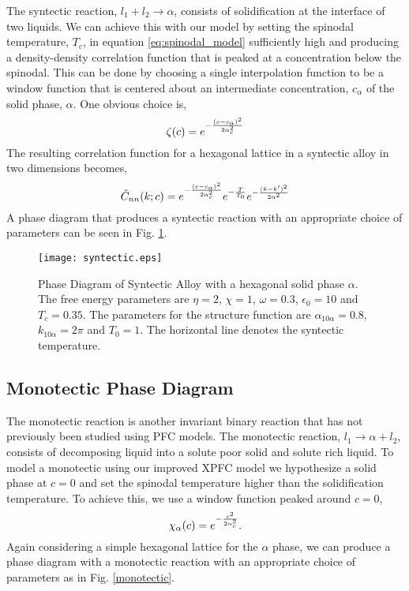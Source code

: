 The syntectic reaction, $l_1 + l_2 \rightarrow \alpha $, consists of
solidification at the interface of two liquids. We can achieve this with our
model by setting the spinodal temperature, $T_c$, in equation
\ref{eq:spinodal_model} sufficiently high and producing a density-density
correlation function that is peaked at a concentration below the spinodal. This
can be done by choosing a single interpolation function to be a window 
function that is centered about an intermediate concentration, $c_\alpha$ of 
the solid phase, $\alpha$. One obvious choice is, 
%
\begin{equation}
  \zeta(c) = e^{- \frac{(c - c_\alpha)^2}{2 \alpha_c^2}}
\end{equation}
%
The resulting correlation function for a hexagonal lattice in a syntectic alloy
in two dimensions becomes, 
%
\begin{equation}
  \tilde{C}_{nn}(k; c) = 
    e^{-\frac{(c - c_\alpha)^2}{2 \alpha_c^2}}
    e^{-\frac{T}{T_0}} 
    e^{-\frac{(k - k^\prime)^2}{2\alpha^2}}
\end{equation}
%
A phase diagram that produces a syntectic reaction with an appropriate choice
of parameters can be seen in Fig. \ref{syntectic}.

\begin{figure}
    \centering
	\texttt{[image: syntectic.eps]}
    \caption[Syntectic Phase Diagram]{
        \label{syntectic} Phase Diagram of Syntectic Alloy with a hexagonal
        solid phase $\alpha$. The free energy parameters are $\eta=2$,
        $\chi=1$, $\omega=0.3$, $\epsilon_0 = 10$ and $T_c=0.35$. The
        parameters for the structure function are $\alpha_{10\alpha} = 0.8$,
        $k_{10\alpha} = 2\pi$ and $T_0 = 1$. The horizontal line denotes the
        syntectic temperature.
    }
\end{figure}

\subsection{Monotectic Phase Diagram} %

The monotectic reaction is another invariant binary reaction that has not
previously been studied using PFC models. The monotectic reaction, $l_1
\rightarrow \alpha + l_2$, consists of decomposing liquid into a solute poor
solid and solute rich liquid. To model a monotectic using our improved XPFC
model we hypothesize a solid phase at $c=0$ and set the spinodal temperature
higher than the solidification temperature. To achieve this, we use a window
function peaked around $c = 0$,
%
\begin{equation}
    \chi_\alpha(c) = e^{-\frac{c^2}{2\alpha_c^2}}.
\end{equation}
%
Again considering a simple hexagonal lattice for the $\alpha$ phase, we can
produce a phase diagram with a monotectic reaction with an appropriate choice
of parameters as in Fig. \ref{monotectic}.

